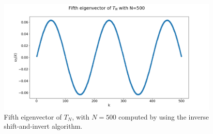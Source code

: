 \documentclass[a4paper,11pt]{article}
\begin{document}
\begin{figure}[H]
	\centering
	\includegraphics[scale=0.40]{Plot/Fifth_eigvect_tn_n=500.png}
	\caption{Fifth eigenvector of $T_{N}$, with $N=500$ computed by using the inverse shift-and-invert algorithm.}
	\label{Fig:Fifth_eigvect_Tn}
\end{figure}
\end{document}
